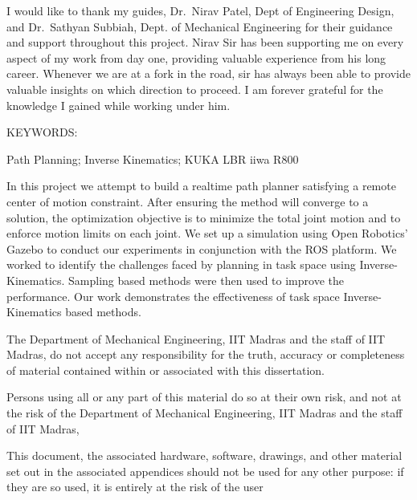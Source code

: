 \documentclass[BTech]{iitmdiss}
\begin{document}
    \acknowledgements

    I would like to thank my guides, Dr.\ Nirav Patel, Dept of Engineering Design, and Dr.\ Sathyan Subbiah, Dept. of Mechanical Engineering for their guidance and support throughout this project.
    Nirav Sir has been supporting me on every aspect of my work from day one, providing valuable experience from his long career.
    Whenever we are at a fork in the road, sir has always been able to provide valuable insights on which direction to proceed.
    I am forever grateful for the knowledge I gained while working under him.



    \abstract

    \noindent KEYWORDS: \hspace*{0.5em} \parbox[t]{4.4in}{Path Planning; Inverse Kinematics; KUKA LBR iiwa R800}

    \vspace*{24pt}
    \noindent
    In this project we attempt to build a realtime path planner satisfying a remote center of motion constraint.
    After ensuring the method will converge to a solution, the optimization objective is to minimize the total joint motion and to enforce motion limits on each joint.
    We set up a simulation using Open Robotics’ Gazebo to conduct our experiments in conjunction with the ROS platform.
    We worked to identify the challenges faced by planning in task space using Inverse-Kinematics.
    Sampling based methods were then used to improve the performance.
    Our work demonstrates the effectiveness of task space Inverse-Kinematics based methods.



    \pagebreak

    \disclaimer
    The Department of Mechanical Engineering, IIT Madras and the staff of IIT Madras, do not accept any responsibility for the truth, accuracy or completeness of material contained within or associated with this dissertation.

    Persons using all or any part of this material do so at their own risk, and not at the risk of the Department of Mechanical Engineering, IIT Madras and the staff of IIT Madras,

    This document, the associated hardware, software, drawings, and other material set out in the associated appendices should not be used for any other purpose: if they are so used, it is entirely at the risk of the user
\end{document}
